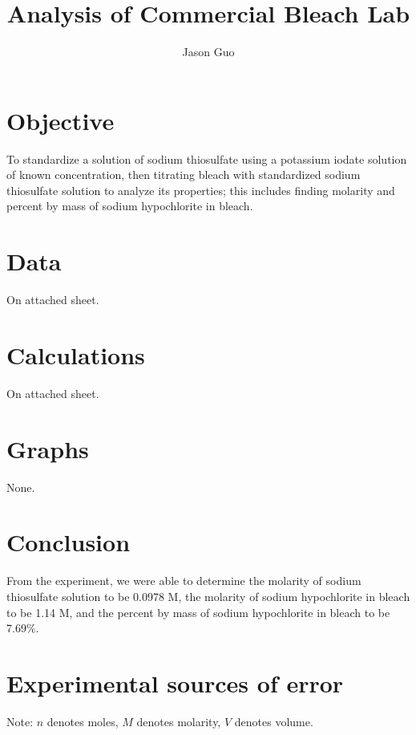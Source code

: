 \documentclass[11pt]{article} %
\title{Analysis of Commercial Bleach Lab}
\author{Jason Guo}
\begin{document}
\maketitle

\section{Objective}

To standardize a solution of sodium thiosulfate using a potassium iodate solution of known concentration, then titrating bleach with standardized sodium thiosulfate solution to analyze its properties; this includes finding molarity and percent by mass of sodium hypochlorite in bleach.

\section{Data}

On attached sheet.

\section{Calculations}

On attached sheet.

\section{Graphs}

None.

\section{Conclusion}

From the experiment, we were able to determine the molarity of sodium thiosulfate solution to be 0.0978 M, the molarity of sodium hypochlorite in bleach to be 1.14 M, and the percent by mass of sodium hypochlorite in bleach to be 7.69\%.

\section{Experimental sources of error}

Note: $n$ denotes moles, $M$ denotes molarity, $V$ denotes volume.
\end{document}

